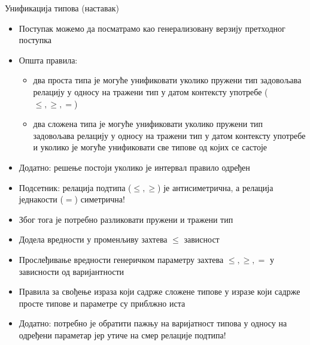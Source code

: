 \documentclass[xcolor=table]{beamer}
\begin{document}
    \begin{frame}[allowframebreaks]{Унификација типова (наставак)}
        \begin{itemize}
            \item Поступак можемо да посматрамо као генерализовану верзију претходног поступка
            \item Општа правила:
            \begin{itemize}
                \item два проста типа је могуће унификовати уколико пружени тип задовољава релацију у односу на тражени тип у датом контексту употребе (\begin{math}\leq, \geq, =\end{math})
                \item два сложена типа је могуће унификовати уколико пружени тип задовољава релацију у односу на тражени тип у датом контексту употребе и уколико је могуће унификовати све типове од којих се састоје
            \end{itemize}
            \item Додатно: решење постоји уколико је интервал правило одређен
        \end{itemize}
        
        \framebreak
        
        \begin{itemize}
            \item Подсетник: релација подтипа (\begin{math}\leq, \geq\end{math}) је антисиметрична, а релација једнакости (\begin{math}=\end{math}) симетрична!
            \item Због тога је потребно разликовати пружени и тражени тип
            \item Додела вредности у променљиву захтева \begin{math}\leq\end{math} зависност
            \item Прослеђивање вредности генеричком параметру захтева \begin{math}\leq, \geq, =\end{math} у зависности од варијантности
            \item Правила за свођење израза који садрже сложене типове у изразе који садрже просте типове и параметре су приблжно иста
            \item Додатно: потребно је обратити пажњу на варијатност типова у односу на одређени параметар јер утиче на смер релације подтипа!
        \end{itemize}
        

\end{frame}
\end{document}
